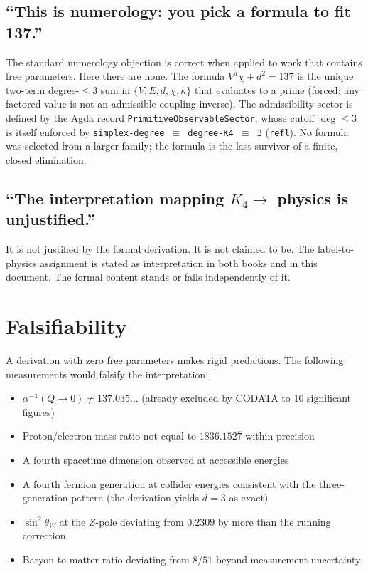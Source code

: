 \documentclass[11pt,a4paper]{article}
\theoremstyle{definition}
\begin{document}
\subsection*{``This is numerology: you pick a formula to fit 137.''}

The standard numerology objection is correct when applied to work that contains
free parameters.  Here there are none.  The formula $V^d\chi + d^2 = 137$
is the unique two-term degree-$\le 3$ sum in $\{V,E,d,\chi,\kappa\}$ that
evaluates to a prime (forced: any factored value is not an admissible coupling
inverse).  The admissibility sector is defined by the Agda record
\texttt{PrimitiveObservableSector}, whose cutoff $\deg \le 3$ is itself
enforced by \texttt{simplex-degree $\equiv$ degree-K4 $\equiv$ 3} (\texttt{refl}).
No formula was selected from a larger family; the formula is the last survivor
of a finite, closed elimination.

\subsection*{``The interpretation mapping $K_4 \to$ physics is unjustified.''}

It is not justified by the formal derivation.  It is not claimed to be.
The label-to-physics assignment is stated as interpretation in both books and
in this document.  The formal content stands or falls independently of it.

\section{Falsifiability}
\label{sec:falsifiability}

A derivation with zero free parameters makes rigid predictions.  The following
measurements would falsify the interpretation:

\begin{itemize}[nosep, leftmargin=1.4em]
\item $\alpha^{-1}(Q \to 0) \ne 137.035\ldots$ (already excluded by CODATA
  to 10 significant figures)
\item Proton/electron mass ratio not equal to $1836.152\overline{7}$ within
  precision
\item A fourth spacetime dimension observed at accessible energies
\item A fourth fermion generation at collider energies consistent with the
  three-generation pattern (the derivation yields $d = 3$ as exact)
\item $\sin^2\theta_W$ at the $Z$-pole deviating from $0.2309$ by more than
  the running correction
\item Baryon-to-matter ratio deviating from $8/51$ beyond measurement
  uncertainty
\end{itemize}
\end{document}
